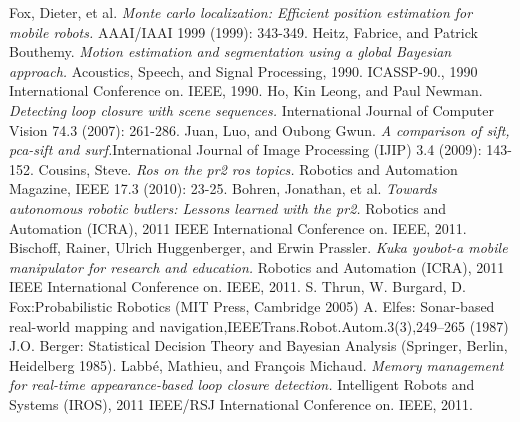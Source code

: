 \documentclass[conference]{IEEEtran}
\begin{document}
\begin{thebibliography}{1}
\bibitem{}
    Fox, Dieter, et al. \emph{Monte carlo localization: Efficient position estimation for mobile robots.} AAAI/IAAI 1999 (1999): 343-349. 
\bibitem{}
    Heitz, Fabrice, and Patrick Bouthemy. \emph{Motion estimation and segmentation using a global Bayesian approach.} Acoustics, Speech, and Signal Processing, 1990. ICASSP-90., 1990 International Conference on. IEEE, 1990. 
\bibitem{}
    Ho, Kin Leong, and Paul Newman. \emph{Detecting loop closure with scene sequences.} International Journal of Computer Vision 74.3 (2007): 261-286. 
\bibitem{}
   Juan, Luo, and Oubong Gwun. \emph{A comparison of sift, pca-sift and surf.}International Journal of Image Processing (IJIP) 3.4 (2009): 143-152.
\bibitem{}
    Cousins, Steve. \emph{Ros on the pr2 ros topics.} Robotics and Automation Magazine, IEEE 17.3 (2010): 23-25.
\bibitem{}
    Bohren, Jonathan, et al. \emph{Towards autonomous robotic butlers: Lessons learned with the pr2.} Robotics and Automation (ICRA), 2011 IEEE International Conference on. IEEE, 2011.
\bibitem{}
    Bischoff, Rainer, Ulrich Huggenberger, and Erwin Prassler. \emph{Kuka youbot-a mobile manipulator for research and education.} Robotics and Automation (ICRA), 2011 IEEE International Conference on. IEEE, 2011. 
\bibitem{}
   S. Thrun, W. Burgard, D. Fox:Probabilistic Robotics (MIT Press, Cambridge 2005)
\bibitem{}
   A. Elfes: Sonar-based real-world mapping and navigation,IEEETrans.Robot.Autom.3(3),249–265 (1987) 
\bibitem{}
    J.O. Berger: Statistical Decision Theory and Bayesian Analysis (Springer, Berlin, Heidelberg 1985).
\bibitem{}
    Labbé, Mathieu, and François Michaud. \emph{Memory management for real-time appearance-based loop closure detection.} Intelligent Robots and Systems (IROS), 2011 IEEE/RSJ International Conference on. IEEE, 2011.

\end{thebibliography}
\end{document}
